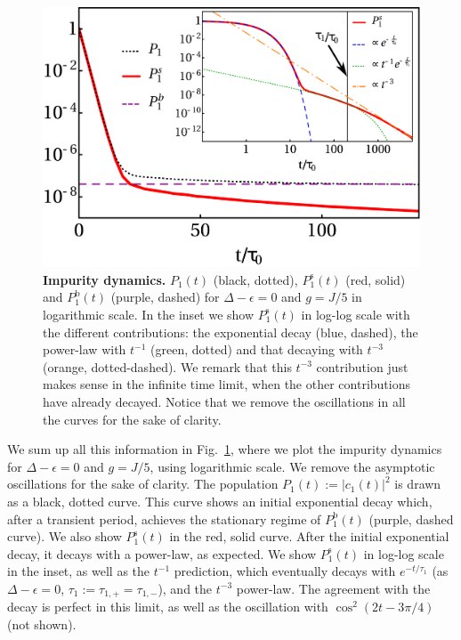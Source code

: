 \documentclass[aps,pra,twocolumn,floatfix,superscriptaddress]{revtex4-1}%
\begin{document}
\begin{figure}[thb!]
\includegraphics[width=1.0\columnwidth]{P_Delta_0_g_0_2.pdf}
\caption{{\bf Impurity dynamics.} $P_1(t)$ (black, dotted), $P_1^\text{s}(t)$ (red, solid) and $P_1^\text{b}(t)$ (purple, dashed) for $\Delta-\epsilon=0$ and $g=J/5$ in logarithmic scale. In the inset we show $P_1^\text{s}(t)$ in log-log scale with the different contributions: the exponential decay (blue, dashed), the power-law with $t^{-1}$ (green, dotted) and that decaying with $t^{-3}$ (orange, dotted-dashed). We remark that this $t^{-3}$ contribution just makes sense in the infinite time limit, when the other contributions have already decayed. Notice that we remove the oscillations in all the curves for the sake of clarity.}\label{fig:qubit_dynamics}
\end{figure}

We sum up all this information in Fig.\ \ref{fig:qubit_dynamics}, where we plot the impurity dynamics for $\Delta-\epsilon=0$ and $g=J/5$, using logarithmic scale. 
We remove the asymptotic oscillations for the sake of clarity. The population $P_1(t):=|c_1(t)|^2$ is drawn as a black, dotted curve. This curve shows an initial exponential decay which, after a transient period, achieves the stationary regime of $P_1^\text{b}(t)$ (purple, dashed curve). We also show $P_1^\text{s}(t)$ in the red, solid curve. After the initial exponential decay, it decays with a power-law, as expected. We show $P_1^\text{s}(t)$ in log-log scale in the inset, as well as the $t^{-1}$ prediction, which eventually decays with $e^{-t/\tau_1}$ (as $\Delta-\epsilon=0$, $\tau_1:=\tau_{1,+}=\tau_{1,-}$), and the $t^{-3}$ power-law. The agreement with the decay is perfect in this limit, as well as the oscillation with $\cos^2(2t-3\pi/4)$ (not shown).
\end{document}
